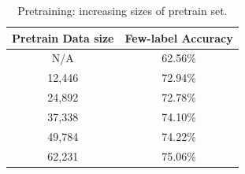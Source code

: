 \begin{table}[htbp]
\vspace{-4mm}
\centering
\footnotesize
\begin{tabular}{c|c}
\toprule
 Pretrain Data size & Few-label Accuracy \\
 \hline
   N/A & 62.56\%   \\
   \hline
   12,446 & 72.94\%\\
   24,892 &  72.78\%\\
   37,338 & 74.10\%\\
   49,784 & 74.22\%\\
   62,231 & 75.06\% \\
 \bottomrule
\end{tabular}
\caption{\system Pretraining: increasing sizes of pretrain set.}
\label{tab.pretrainsize}
\vspace{-8mm}
\end{table}

